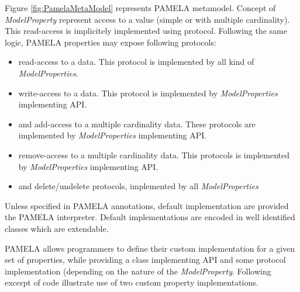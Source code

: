 Figure \ref{fig:PamelaMetaModel} represents PAMELA metamodel. Concept of \emph{ModelProperty} represent access to a value (simple or with multiple cardinality). This read-access is implicitely implemented using  protocol. Following the same logic, PAMELA properties may expose following protocols:
\begin{itemize}
    \item {} read-access to a data. This protocol is implemented by all kind of \emph{ModelProperties}.
    \item {} write-access to a data. This protocol is implemented by \emph{ModelProperties} implementing  API.
    \item {} and  add-access to a multiple cardinality data. These protocols are implemented by \emph{ModelProperties} implementing  API.
    \item {} remove-access to a multiple cardinality data. This protocols is implemented by \emph{ModelProperties} implementing  API.
    \item {} and  delete/undelete protocols, implemented by all \emph{ModelProperties}
\end{itemize}

Unless specified in  PAMELA annotations, default implementation are provided the PAMELA interpreter. Default implementations are encoded in well identified classes which are extendable. 

PAMELA allows programmers to define their custom implementation for a given set of properties, while providing a class implementing  API and some protocol implementation (depending on the nature of the \emph{ModelProperty}. Following excerpt of code illustrate use of two custom property implementations.

